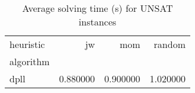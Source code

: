 \begin{table}
\caption{Average solving time (s) for UNSAT instances}
\label{tab:avg-time-unsat}
\begin{tabular}{lrrr}
\toprule
heuristic & jw & mom & random \\
algorithm &  &  &  \\
\midrule
dpll & 0.880000 & 0.900000 & 1.020000 \\
\bottomrule
\end{tabular}
\end{table}
